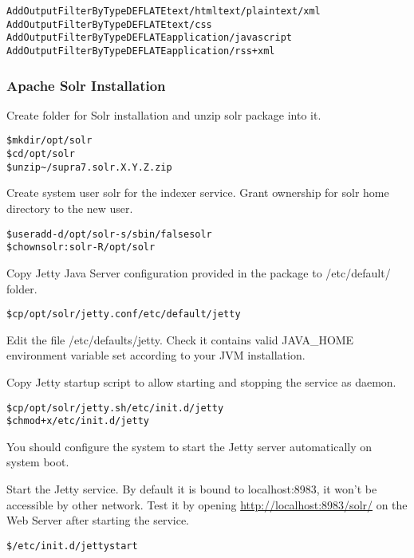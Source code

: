 \documentclass[12pt]{article}
\newcommand{\vigPackageName}{supra7}
\newcommand{\vigReleasePath}{\textasciitilde/}
\begin{document}
\begin{alltt}
AddOutputFilterByType DEFLATE text/html text/plain text/xml
AddOutputFilterByType DEFLATE text/css
AddOutputFilterByType DEFLATE application/javascript
AddOutputFilterByType DEFLATE application/rss+xml
\end{alltt}

\subsubsection{Apache Solr Installation\label{solrInstallation}}

Create folder for Solr installation and unzip solr package into it.

\begin{alltt}
\$ mkdir /opt/solr
\$ cd /opt/solr
\$ unzip {\vigReleasePath}{\vigPackageName}.solr.X.Y.Z.zip
\end{alltt}

Create system user \textsf{solr} for the indexer service. Grant ownership for solr home directory to the new user.

\begin{alltt}
\$ useradd -d /opt/solr -s /sbin/false solr
\$ chown solr:solr -R /opt/solr
\end{alltt}

Copy Jetty Java Server configuration provided in the package to \textsf{/etc/default/} folder.

\begin{alltt}
\$ cp /opt/solr/jetty.conf /etc/default/jetty
\end{alltt}

Edit the file \textsf{/etc/defaults/jetty}. Check it contains valid JAVA\_HOME environment variable set according to your JVM installation.

Copy Jetty startup script to allow starting and stopping the service as daemon.

\begin{alltt}
\$ cp /opt/solr/jetty.sh /etc/init.d/jetty
\$ chmod +x /etc/init.d/jetty
\end{alltt}

You should configure the system to start the Jetty server automatically on system boot.

Start the Jetty service. By default it is bound to localhost:8983, it won't be accessible by other network. Test it by opening \url{http://localhost:8983/solr/} on the Web Server after starting the service.

\begin{alltt}
\$ /etc/init.d/jetty start
\end{alltt}
\end{document}
